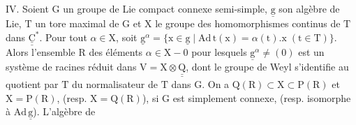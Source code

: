 IV. Soient $\mathrm G$ un groupe de Lie compact connexe semi-simple, $\underline{\mathrm g}$ son algèbre de Lie, $\mathrm T$ un tore maximal de $\mathrm G$ et $\mathrm X$ le groupe des homomorphismes continus de $\mathrm T$ dans $\underline{\underline{\mathrm C}}^{*}$. Pour tout $\alpha\in\mathrm X$, soit $\underline{\mathrm g}^{\alpha}=\{\mathrm x\in\underline{\mathrm g}\mid\mathrm{Ad}\,\mathrm t(\mathrm x)=\alpha(\mathrm t).\mathrm x\;(\mathrm t\in\mathrm T)\}$. Alors l'ensemble $\mathrm R$ des éléments $\alpha\in\mathrm X-0$ pour lesquels $\underline{\mathrm g}^{\alpha}\ne(0)$ est un système de racines réduit dans $\mathrm V=\mathrm X\otimes\underline{\underline{\mathrm Q}}$, dont le groupe de Weyl s'identifie au quotient par $\mathrm T$ du normalisateur de $\mathrm T$ dans $\mathrm G$. On a $\mathrm Q(\mathrm R)\subset\mathrm X\subset\mathrm P(\mathrm R)$ et $\mathrm X=\mathrm P(\mathrm R)$, (resp. $\mathrm X=\mathrm Q(\mathrm R)$), si $\mathrm G$ est simplement connexe, (resp. isomorphe à $\mathrm{Ad}\,\underline{\mathrm g}$). L'algèbre de

